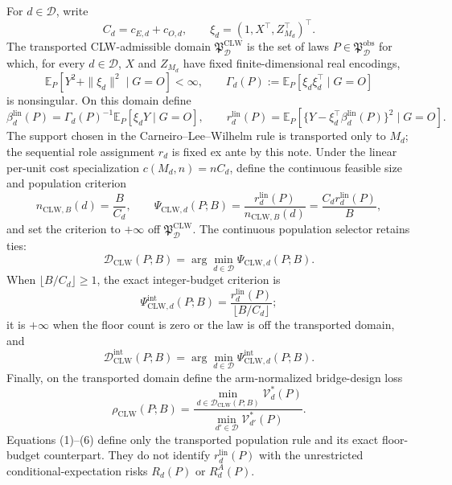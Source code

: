 For \(d\in\mathcal D\), write
\[
 C_d=c_{E,d}+c_{O,d},
 \qquad
 \xi_d=(1,X^\top,Z_{M_d}^\top)^\top.
\]
The transported CLW-admissible domain \(\mathfrak P_{\mathcal D}^{\mathrm{CLW}}\) is the set of laws \(P\in\mathfrak P_{\mathcal D}^{\mathrm{obs}}\) for which, for every \(d\in\mathcal D\), \(X\) and \(Z_{M_d}\) have fixed finite-dimensional real encodings,
\[
 \mathbb E_P[Y^2+\|\xi_d\|^2\mid G=O]<\infty,
 \qquad
 \Gamma_d(P):=\mathbb E_P[\xi_d\xi_d^\top\mid G=O]
\]
is nonsingular.  On this domain define
\[
 \beta_d^{\mathrm{lin}}(P)
 =\Gamma_d(P)^{-1}\mathbb E_P[\xi_dY\mid G=O],
 \qquad
 r_d^{\mathrm{lin}}(P)
 =\mathbb E_P\!\left[
 \{Y-\xi_d^\top\beta_d^{\mathrm{lin}}(P)\}^2\mid G=O
 \right].                                                     \tag{1}
\]
The support chosen in the Carneiro--Lee--Wilhelm rule is transported only to \(M_d\); the sequential role assignment \(r_d\) is fixed ex ante by this note.  Under the linear per-unit cost specialization \(c(M_d,n)=nC_d\), define the continuous feasible size and population criterion
\[
 n_{\mathrm{CLW},B}(d)=\frac{B}{C_d},
 \qquad
 \Psi_{\mathrm{CLW},d}(P;B)
 =\frac{r_d^{\mathrm{lin}}(P)}{n_{\mathrm{CLW},B}(d)}
 =\frac{C_dr_d^{\mathrm{lin}}(P)}{B},                       \tag{2}
\]
and set the criterion to \(+\infty\) off \(\mathfrak P_{\mathcal D}^{\mathrm{CLW}}\).  The continuous population selector retains ties:
\[
 \mathcal D_{\mathrm{CLW}}(P;B)
 =\arg\min_{d\in\mathcal D}\Psi_{\mathrm{CLW},d}(P;B).   \tag{3}
\]
When \(\lfloor B/C_d\rfloor\ge1\), the exact integer-budget criterion is
\[
 \Psi_{\mathrm{CLW},d}^{\mathrm{int}}(P;B)
 =\frac{r_d^{\mathrm{lin}}(P)}{\lfloor B/C_d\rfloor};       \tag{4}
\]
it is \(+\infty\) when the floor count is zero or the law is off the transported domain, and
\[
 \mathcal D_{\mathrm{CLW}}^{\mathrm{int}}(P;B)
 =\arg\min_{d\in\mathcal D}
 \Psi_{\mathrm{CLW},d}^{\mathrm{int}}(P;B).                \tag{5}
\]
Finally, on the transported domain define the arm-normalized bridge-design loss
\[
 \rho_{\mathrm{CLW}}(P;B)
 =\frac{\min_{d\in\mathcal D_{\mathrm{CLW}}(P;B)}
 \mathcal V_d^*(P)}
 {\min_{d'\in\mathcal D}\mathcal V_{d'}^*(P)}.             \tag{6}
\]
Equations (1)--(6) define only the transported population rule and its exact floor-budget counterpart.  They do not identify \(r_d^{\mathrm{lin}}(P)\) with the unrestricted conditional-expectation risks \(R_d(P)\) or \(R_d^A(P)\).